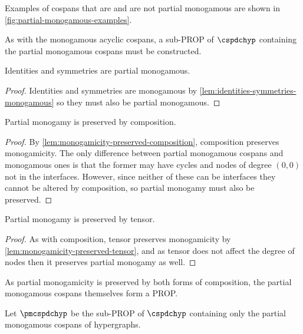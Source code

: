 

\begin{example}
    Examples of cospans that are and are not partial monogamous are shown
    in \cref{fig:partial-monogamous-examples}.
\end{example}

As with the monogamous acyclic cospans, a sub-PROP of \(\cspdchyp\) containing
the partial monogamous cospans must be constructed.

\begin{lemma}\label{lem:identities-symmetries-partial-monogamous}
    Identities and symmetries are partial monogamous.
\end{lemma}
\begin{proof}
    Identities and symmetries are monogamous by
    \cref{lem:identities-symmetries-monogamous} so they must also be partial
    monogamous.
\end{proof}

\begin{lemma}\label{lem:partial-monogamicity-preserved-composition}
    Partial monogamy is preserved by composition.
\end{lemma}
\begin{proof}
    By \cref{lem:monogamicity-preserved-composition}, composition preserves
    monogamicity.
    The only difference between partial monogamous cospans and monogamous ones
    is that the former may have cycles and nodes of degree \((0,0)\) not in the
    interfaces.
    However, since neither of these can be interfaces they cannot be altered by
    composition, so partial monogamy must also be preserved.
\end{proof}

\begin{lemma}\label{lem:partial-monogamicity-preserved-tensor}
    Partial monogamy is preserved by tensor.
\end{lemma}
\begin{proof}
    As with composition, tensor preserves monogamicity by
    \cref{lem:monogamicity-preserved-tensor}, and as tensor does not affect the
    degree of nodes then it preserves partial monogamy as well.
\end{proof}

As partial monogamicity is preserved by both forms of composition, the
partial monogamous cospans themselves form a PROP.

\begin{definition}
    Let \(\pmcspdchyp\) be the sub-PROP of \(\cspdchyp\) containing only the
    partial monogamous cospans of hypergraphs.
\end{definition}

